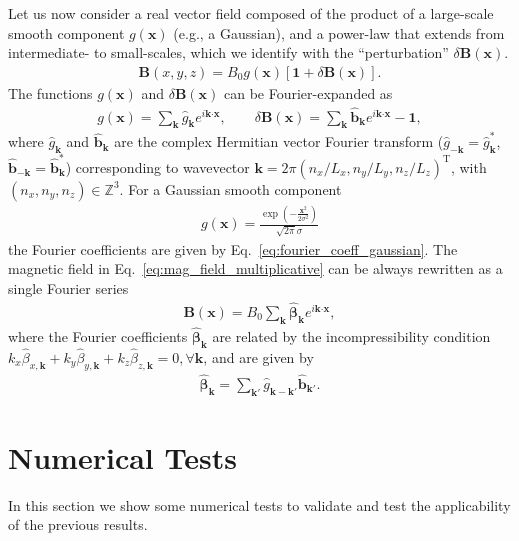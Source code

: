 \documentclass[]{article}
\newcommand{\bcdot}{\bm{\cdot}}
\begin{document}
Let us now consider a real vector field composed of the product of a large-scale smooth component $ g(\bm x)$ (e.g., a Gaussian), and a power-law that extends from intermediate- to small-scales, which we identify with the ``perturbation'' $\delta \bm B(\bm x)$.
%
\begin{align}\label{eq:mag_field_multiplicative}
	\bm B (x,y,z) = B_0  g(\bm x) \left[ \bm 1 + \delta \bm B(\bm x) \right].
\end{align}
%
The functions $g (\bm x)$ and $\delta \bm B(\bm x)$ can be Fourier-expanded as
%
\begin{align}
	g (\bm x) = \sum_{\bm k}  \hat{g}_{\bm k} e^{i \bm k \bcdot \bm x },     \hspace{2em} \delta \bm B (\bm x) = \sum_{\bm k}  \hat{ \bm b}_{\bm k} e^{i \bm k \bcdot \bm x } - \bm 1,
\end{align}
%
where $\hat{g}_{\bm k}$ and $\hat{\bm b}_{\bm k}$ are the complex Hermitian vector Fourier transform ($\hat{g}_{-\bm k} = \hat{g}_{\bm k}^*$, $\hat{\bm  b}_{-\bm k} = \hat{\bm b}_{\bm k}^*$) corresponding to wavevector $\bm k = 2 \pi \left(n_x/L_x, n_y/L_y, n_z/L_z \right)^\mathrm{T}$, with $\left(n_x, n_y, n_z \right) \in \mathbb{Z}^3$. For a Gaussian smooth component
%
\begin{align}
	g(\bm x) = \frac{\exp \left(-\frac{\bm x^2}{2 \sigma ^2}\right)}{\sqrt{2 \pi } \sigma }
\end{align}
%
the Fourier coefficients are given by Eq.~\eqref{eq:fourier_coeff_gaussian}. The magnetic field in Eq.~\eqref{eq:mag_field_multiplicative} can be always rewritten as a single Fourier series
%
\begin{align}
	\bm B (\bm x) = B_0 \sum_{\bm k}  \hat{ \bm \beta}_{\bm k} e^{i \bm k \bcdot \bm x },
\end{align}
%
where the Fourier coefficients  $\hat{ \bm \beta}_{\bm k}$ are related by the incompressibility condition $k_x \hat{\beta}_{x,\bm k} + k_y \hat{\beta}_{y,\bm k} + k_z \hat{\beta}_{z,\bm k} = 0, \forall \bm k$, and are given by
%
\begin{align}
	\hat{\bm \beta}_{\bm k} = \sum_{\bm k'}  \hat{g}_{\bm k - \bm k'} \hat{\bm b}_{\bm k'}. 
\end{align}

\newpage

\section{Numerical Tests}

In this section we show some numerical tests to validate and test the applicability of the previous results.
\end{document}
